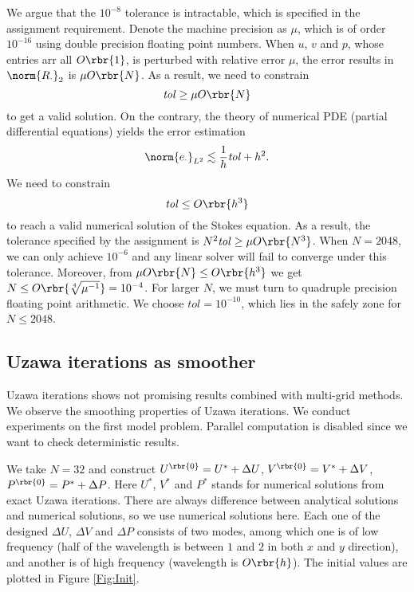 \documentclass[english, nochinese]{pnote}
\begin{document}
We argue that the $10^{-8}$ tolerance is intractable, which is specified in the assignment requirement. Denote the machine precision as $\mu$, which is of order $10^{-16}$ using double precision floating point numbers. When $u$, $v$ and $p$, whose entries arr all $ O \rbr{1} $, is perturbed with relative error $\mu$, the error results in $\norm{R_{\cdot}}_2$ is $ \mu O \rbr{N} $. As a result, we need to constrain
\begin{equation}
\mathit{tol} \ge \mu O \rbr{N} 
\end{equation}
to get a valid solution. On the contrary, the theory of numerical PDE (partial differential equations) yields the error estimation
\begin{equation}
\norm{e_{\cdot}}_{L^2} \lesssim \frac{1}{h} \mathit{tol} + h^2.
\end{equation}
We need to constrain
\begin{equation}
\mathit{tol} \le O \rbr{h^3}
\end{equation}
to reach a valid numerical solution of the Stokes equation. As a result, the tolerance specified by the assignment is $ N^2 \mathit{tol} \ge \mu O \rbr{N^3} $. When $ N = 2048 $, we can only achieve $10^{-6}$ and any linear solver will fail to converge under this tolerance. Moreover, from $ \mu O \rbr{N} \le O \rbr{h^3} $ we get $ N \le O \rbr{\sqrt[4]{\mu^{-1}}} = 10^{-4} $. For larger $N$, we must turn to quadruple precision floating point arithmetic. We choose $ \mathit{tol} = 10^{-10} $, which lies in the safely zone for $ N \le 2048 $.

\subsection{Uzawa iterations as smoother} \label{SubSec:Smooth}

Uzawa iterations shows not promising results combined with multi-grid methods. We observe the smoothing properties of Uzawa iterations. We conduct experiments on the first model problem. Parallel computation is disabled since we want to check deterministic results.

We take $ N = 32 $ and construct $ U^{\rbr{0}} = U^{\ast} + \Delta U $, $ V^{\rbr{0}} = V^{\ast} + \Delta V $, $ P^{\rbr{0}} = P^{\ast} + \Delta P $. Here $U^{\ast}$, $V^{\ast}$ and $P^{\ast}$ stands for numerical solutions from exact Uzawa iterations. There are always difference between analytical solutions and numerical solutions, so we use numerical solutions here. Each one of the designed $ \Delta U $, $ \Delta V $ and $ \Delta P $ consists of two modes, among which one is of low frequency (half of the wavelength is between $1$ and $2$ in both $x$ and $y$ direction), and another is of high frequency (wavelength is $ O \rbr{h} $). The initial values are plotted in Figure \ref{Fig:Init}.
\end{document}
